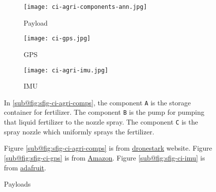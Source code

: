 \begin{figure}
    \centering
    \begin{subfigure}[b]{0.475\textwidth}
        \texttt{[image: ci-agri-components-ann.jpg]}
        \caption{Payload}
        \label{fig:sfig-ci-agri-comps}
    \end{subfigure}
    \begin{subfigure}[b]{0.249\textwidth}
        \texttt{[image: ci-gps.jpg]}
        \caption{GPS}
        \label{fig:sfig-ci-gps}
    \end{subfigure}
    \begin{subfigure}[b]{0.249\textwidth}
        \texttt{[image: ci-agri-imu.jpg]}
        \caption{IMU}
        \label{fig:sfig-ci-imu}
    \end{subfigure}
    \caption{Payloads}
    \small
        In \ref{sub@fig:sfig-ci-agri-comps}, the component \texttt{A} is the storage container for fertilizer. The component \texttt{B} is the pump for pumping that liquid fertilizer to the nozzle spray. The component \texttt{C} is the spray nozzle which uniformly sprays the fertilizer.

        Figure \ref{sub@fig:sfig-ci-agri-comps} is from \href{https://www.dronestark.com/octaglide}{dronestark} website. Figure \ref{sub@fig:sfig-ci-gps} is from \href{https://www.amazon.in/dp/B06Y2D1F41/ref=cm_sw_em_r_mt_dp_WF3X2SMNF0ES421ECGB4}{Amazon}. Figure \ref{sub@fig:sfig-ci-imu} is from \href{https://learn.adafruit.com/adafruit-9-dof-imu-breakout}{adafruit}.
\end{figure}
